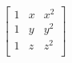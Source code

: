 \documentclass{article}
\begin{document}
\begin{align}
	\begin{bmatrix}
		1 & x & x^{2} \\
		1 & y & y^{2} \\
		1 & z & z^{2} \\
	\end{bmatrix}
\end{align}
\end{document}
